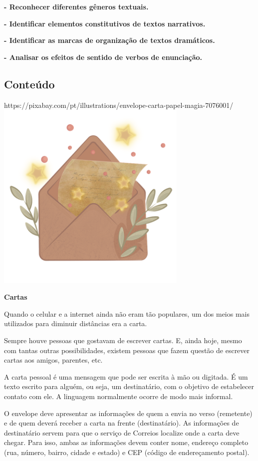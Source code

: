 \begin{itemize}
\textbf{- Reconhecer diferentes gêneros textuais.}

\textbf{- Identificar elementos constitutivos de textos narrativos.}

\textbf{- Identificar as marcas de organização de textos dramáticos.}

\textbf{- Analisar os efeitos de sentido de verbos de enunciação.}

\subsection{Conteúdo}\label{conteuxfado-1}

https://pixabay.com/pt/illustrations/envelope-carta-papel-magia-7076001/\includegraphics[width=3.59956in,height=3.60972in]{media/image7.png}

\textbf{Cartas }

Quando o celular e a internet ainda não eram tão populares, um dos meios
mais utilizados para diminuir distâncias era a carta.

Sempre houve pessoas que gostavam de escrever cartas. E, ainda hoje,
mesmo com tantas outras possibilidades, existem pessoas que fazem
questão de escrever cartas aos amigos, parentes, etc.

A carta pessoal é uma mensagem que pode ser escrita à mão ou digitada. É
um texto escrito para alguém, ou seja, um destinatário, com o objetivo
de estabelecer contato com ele. A linguagem normalmente ocorre de modo
mais informal.

O envelope deve apresentar as informações de quem a envia no verso
(remetente) e de quem deverá receber a carta na frente (destinatário).
As informações de destinatário servem para que o serviço de Correios
localize onde a carta deve chegar. Para isso, ambas as informações devem
conter nome, endereço completo (rua, número, bairro, cidade e estado) e
CEP (código de endereçamento postal).


\end{itemize}
